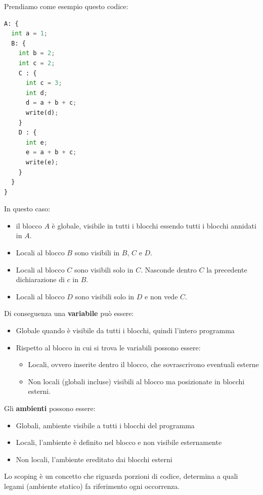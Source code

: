 \documentclass[a4paper]{article}
\begin{document}
\begin{Example}{}{}
Prendiamo come esempio questo codice:
\begin{lstlisting}[language=Python]
A: {
  int a = 1;
  B: {
    int b = 2; 
    int c = 2; 
    C : {
      int c = 3;
      int d;
      d = a + b + c;
      write(d);
    }
    D : {
      int e; 
      e = a + b + c;
      write(e);
    }
  }
}
\end{lstlisting}
In questo caso:
\begin{itemize}
  \item il blocco $A$ è globale, visibile in tutti i blocchi 
  essendo tutti i blocchi annidati in $A$.
  \item Locali al blocco $B$ sono visibili in $B$, $C$ e $D$.
  \item Locali al blocco $C$ sono visibili solo in $C$. 
  Nasconde dentro $C$ la precedente dichiarazione di $c$ in $B$.
  \item Locali al blocco $D$ sono visibili solo in $D$ e non vede $C$. 
\end{itemize}
\end{Example}
\noindent
Di conseguenza una \textbf{variabile} può essere:
\begin{itemize}
  \item Globale quando è visibile da tutti i blocchi, quindi l'intero programma
  \item Rispetto al blocco in cui si trova le variabili possono essere:
  \begin{itemize}
    \item Locali, ovvero inserite dentro il blocco, che sovrascrivono eventuali esterne
    \item Non locali (globali incluse) visibili al blocco ma posizionate 
    in blocchi esterni.
  \end{itemize}
\end{itemize}
\noindent
Gli \textbf{ambienti} possono essere:
\begin{itemize}
  \item Globali, ambiente visibile a tutti i blocchi del programma
  \item Locali, l'ambiente è definito nel blocco e non visibile esternamente 
  \item Non locali, l'ambiente ereditato dai blocchi esterni
\end{itemize}
{
  Lo scoping è un concetto che riguarda porzioni di codice, 
  determina a quali legami (ambiente statico) 
  fa riferimento ogni occorrenza.
}
\end{document}

